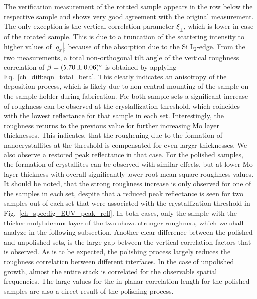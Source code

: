 The verification measurement of the rotated sample appears in the row below the respective sample and shows very good agreement with the original measurement. The only exception is the vertical correlation parameter $\xi_\perp$, which is lower in case of the rotated sample. This is due to a truncation of the scattering intensity to higher values of $|q_x|$, because of the absorption due to the Si L$_2$-edge. From the two measurements, a total non-orthogonal tilt angle of the vertical roughness correlation of $\beta = \SI{5.70\pm 0.06}{\degree}$ is obtained by applying Eq.~\eqref{ch_diff:eqn_total_beta}. This clearly indicates an anisotropy of the deposition process, which is likely due to non-central mounting of the sample on the sample holder during fabrication. For both sample sets a significant increase of roughness can be observed at the crystallization threshold, which coincides with the lowest reflectance for that sample in each set. Interestingly, the roughness returns to the previous value for further increasing Mo layer thicknesses. This indicates, that the roughening due to the formation of nanocrystallites at the threshold is compensated for even larger thicknesses. We also observe a restored peak reflectance in that case. For the polished samples, the formation of crystallites can be observed with similar effects, but at lower Mo layer thickness with overall significantly lower root mean square roughness values. It should be noted, that the strong roughness increase is only observed for one of the samples in each set, despite that a reduced peak reflectance is seen for two samples out of each set that were associated with the crystallization threshold in Fig.~\ref{ch_spec:fig_EUV_peak_refl}. In both cases, only the sample with the thicker molybdenum layer of the two shows stronger roughness, which we shall analyze in the following subsection. Another clear difference between the polished and unpolished sets, is the large gap between the vertical correlation factors that is observed. As is to be expected, the polishing process largely reduces the roughness correlation between different interfaces. In the case of unpolished growth, almost the entire stack is correlated for the observable spatial frequencies. The large values for the in-planar correlation length for the polished samples are also a direct result of the polishing process.

